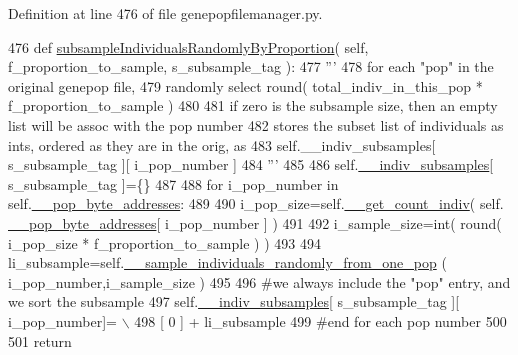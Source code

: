 Definition at line 476 of file genepopfilemanager.\+py.


\begin{DoxyCode}
476     \textcolor{keyword}{def }\hyperlink{classnegui_1_1genepopfilemanager_1_1GenepopFileManager_a5c85ac4838fd6919be1c408bcd39f54e}{subsampleIndividualsRandomlyByProportion}( self, 
      f\_proportion\_to\_sample, s\_subsample\_tag ):
477         \textcolor{stringliteral}{'''}
478 \textcolor{stringliteral}{        for each "pop" in the original genepop file,}
479 \textcolor{stringliteral}{        randomly select round( total\_indiv\_in\_this\_pop * f\_proportion\_to\_sample )}
480 \textcolor{stringliteral}{        }
481 \textcolor{stringliteral}{        if zero is the subsample size, then an empty list will be assoc with the pop number}
482 \textcolor{stringliteral}{        stores the subset list of individuals as ints, ordered as they are in the orig, as      }
483 \textcolor{stringliteral}{        self.\_\_indiv\_subsamples[ s\_subsample\_tag ][ i\_pop\_number ]}
484 \textcolor{stringliteral}{        '''}
485 
486         self.\hyperlink{classnegui_1_1genepopfilemanager_1_1GenepopFileManager_a1e8379bcee4902ca9314ff53fcb71644}{\_\_indiv\_subsamples}[ s\_subsample\_tag ]=\{\}
487 
488         \textcolor{keywordflow}{for} i\_pop\_number \textcolor{keywordflow}{in} self.\hyperlink{classnegui_1_1genepopfilemanager_1_1GenepopFileManager_ae24c2bdd19136a345bdb42fd49c5d91f}{\_\_pop\_byte\_addresses}:
489 
490             i\_pop\_size=self.\hyperlink{classnegui_1_1genepopfilemanager_1_1GenepopFileManager_a378ff9f54898427a5d2c3cb8ab1b2d78}{\_\_get\_count\_indiv}( self.
      \hyperlink{classnegui_1_1genepopfilemanager_1_1GenepopFileManager_ae24c2bdd19136a345bdb42fd49c5d91f}{\_\_pop\_byte\_addresses}[ i\_pop\_number ] )
491 
492             i\_sample\_size=int( round( i\_pop\_size * f\_proportion\_to\_sample ) )
493 
494             li\_subsample=self.\hyperlink{classnegui_1_1genepopfilemanager_1_1GenepopFileManager_ae5a84fa307ba7bbefebe80ac7416c4cd}{\_\_sample\_individuals\_randomly\_from\_one\_pop}
      ( i\_pop\_number,i\_sample\_size )
495 
496             \textcolor{comment}{#we always include the "pop" entry, and we sort the subsample}
497             self.\hyperlink{classnegui_1_1genepopfilemanager_1_1GenepopFileManager_a1e8379bcee4902ca9314ff53fcb71644}{\_\_indiv\_subsamples}[ s\_subsample\_tag ][ i\_pop\_number]= \(\backslash\)
498                      [ 0 ] +  li\_subsample
499         \textcolor{comment}{#end for each pop number}
500 
501         \textcolor{keywordflow}{return}
\end{DoxyCode}

